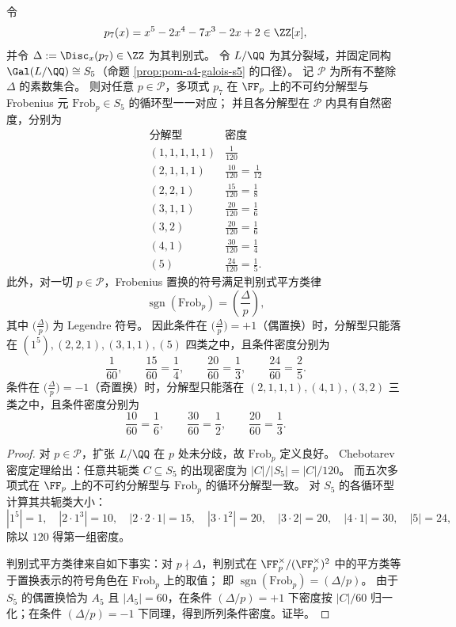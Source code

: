 \begin{theorem}\label{thm:xi-p7-chebotarev-splitting-density}
令
\[
p_7(x)=x^5-2x^4-7x^3-2x+2\in\ZZ[x],
\]
并令 \(\Delta:=\Disc_x(p_7)\in\ZZ\) 为其判别式。
令 \(L/\QQ\) 为其分裂域，并固定同构 \(\Gal(L/\QQ)\cong S_5\)（命题 \ref{prop:pom-a4-galois-s5} 的口径）。
记 \(\mathcal P\) 为所有不整除 \(\Delta\) 的素数集合。
则对任意 \(p\in\mathcal P\)，多项式 \(p_7\) 在 \(\FF_p\) 上的不可约分解型与 Frobenius 元 \(\mathrm{Frob}_p\in S_5\) 的循环型一一对应；
并且各分解型在 \(\mathcal P\) 内具有自然密度，分别为
\[
\begin{array}{c|c}
\text{分解型} & \text{密度}\\ \hline
(1,1,1,1,1) & \frac{1}{120}\\
(2,1,1,1) & \frac{10}{120}=\frac{1}{12}\\
(2,2,1) & \frac{15}{120}=\frac{1}{8}\\
(3,1,1) & \frac{20}{120}=\frac{1}{6}\\
(3,2) & \frac{20}{120}=\frac{1}{6}\\
(4,1) & \frac{30}{120}=\frac{1}{4}\\
(5) & \frac{24}{120}=\frac{1}{5}.
\end{array}
\]
此外，对一切 \(p\in\mathcal P\)，Frobenius 置换的符号满足判别式平方类律
\[
\operatorname{sgn}(\mathrm{Frob}_p)=\left(\frac{\Delta}{p}\right),
\]
其中 \(\bigl(\frac{\Delta}{p}\bigr)\) 为 Legendre 符号。
因此条件在 \(\bigl(\frac{\Delta}{p}\bigr)=+1\)（偶置换）时，分解型只能落在
\((1^5),(2,2,1),(3,1,1),(5)\)
四类之中，且条件密度分别为
\[
\frac{1}{60},\qquad \frac{15}{60}=\frac14,\qquad \frac{20}{60}=\frac13,\qquad \frac{24}{60}=\frac25.
\]
条件在 \(\bigl(\frac{\Delta}{p}\bigr)=-1\)（奇置换）时，分解型只能落在
\((2,1,1,1),(4,1),(3,2)\)
三类之中，且条件密度分别为
\[
\frac{10}{60}=\frac16,\qquad \frac{30}{60}=\frac12,\qquad \frac{20}{60}=\frac13.
\]
\end{theorem}
\begin{proof}
对 \(p\in\mathcal P\)，扩张 \(L/\QQ\) 在 \(p\) 处未分歧，故 \(\mathrm{Frob}_p\) 定义良好。
Chebotarev 密度定理给出：任意共轭类 \(C\subseteq S_5\) 的出现密度为 \(|C|/|S_5|=|C|/120\)。
而五次多项式在 \(\FF_p\) 上的不可约分解型与 \(\mathrm{Frob}_p\) 的循环分解型一致。
对 \(S_5\) 的各循环型计算其共轭类大小：
\[
|1^5|=1,\quad |2\cdot 1^3|=10,\quad |2\cdot 2\cdot 1|=15,\quad |3\cdot 1^2|=20,\quad |3\cdot 2|=20,\quad |4\cdot 1|=30,\quad |5|=24,
\]
除以 \(120\) 得第一组密度。
\par
判别式平方类律来自如下事实：对 \(p\nmid \Delta\)，判别式在 \(\FF_p^\times/(\FF_p^\times)^2\) 中的平方类等于置换表示的符号角色在 \(\mathrm{Frob}_p\) 上的取值；
即 \(\operatorname{sgn}(\mathrm{Frob}_p)=(\Delta/p)\)。
由于 \(S_5\) 的偶置换恰为 \(A_5\) 且 \(|A_5|=60\)，在条件 \((\Delta/p)=+1\) 下密度按 \(|C|/60\) 归一化；在条件 \((\Delta/p)=-1\) 下同理，得到所列条件密度。证毕。
\end{proof}

\endinput
